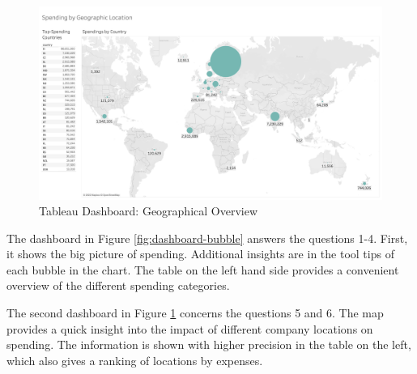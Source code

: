 \begin{figure}
	\centering
	\includegraphics[width=\linewidth]{Bilder/deployment/world.png}
	\caption{Tableau Dashboard: Geographical Overview}
	\label{fig:dashboard-world}
\end{figure}

	The dashboard in Figure \ref{fig:dashboard-bubble} answers the questions 1-4. First, it shows the big picture of spending. Additional insights are in the tool tips of each bubble in the chart. The table on the left hand side provides a convenient overview of the different spending categories.
	
	The second dashboard in Figure \ref{fig:dashboard-world} concerns the questions 5 and 6. The map provides a quick insight into the impact of different company locations on spending. The information is shown with higher precision in the table on the left, which also gives a ranking of locations by expenses.
